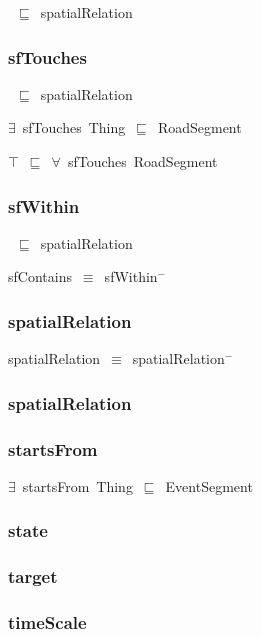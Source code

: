 \documentclass{article}
\begin{document}
~\ensuremath{\sqsubseteq}~spatialRelation

\subsubsection*{sfTouches}

~\ensuremath{\sqsubseteq}~spatialRelation

\ensuremath{\exists}~sfTouches~Thing~\ensuremath{\sqsubseteq}~RoadSegment

\ensuremath{\top}~\ensuremath{\sqsubseteq}~\ensuremath{\forall}~sfTouches~RoadSegment

\subsubsection*{sfWithin}

~\ensuremath{\sqsubseteq}~spatialRelation

sfContains~\ensuremath{\equiv}~sfWithin\ensuremath{^-}

\subsubsection*{spatialRelation}

spatialRelation~\ensuremath{\equiv}~spatialRelation\ensuremath{^-}

\subsubsection*{spatialRelation}

\subsubsection*{startsFrom}

\ensuremath{\exists}~startsFrom~Thing~\ensuremath{\sqsubseteq}~EventSegment

\subsubsection*{state}

\subsubsection*{target}

\subsubsection*{timeScale}
\end{document}
